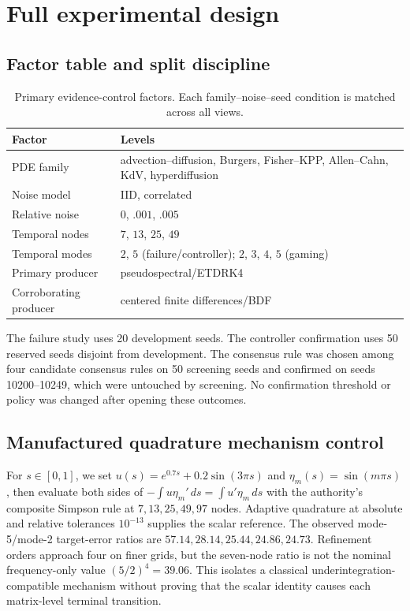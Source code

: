 \documentclass{article}
\begin{document}
\section{Full experimental design}

\subsection{Factor table and split discipline}
\begin{table}[ht]
\centering\small
\caption{Primary evidence-control factors. Each family--noise--seed condition is matched across all
views.}
\begin{tabular}{ll}
\toprule
Factor & Levels \\
\midrule
PDE family & advection--diffusion, Burgers, Fisher--KPP, Allen--Cahn, KdV, hyperdiffusion \\
Noise model & IID, correlated \\
Relative noise & $0$, $.001$, $.005$ \\
Temporal nodes & $7$, $13$, $25$, $49$ \\
Temporal modes & $2$, $5$ (failure/controller); $2$, $3$, $4$, $5$ (gaming) \\
Primary producer & pseudospectral/ETDRK4 \\
Corroborating producer & centered finite differences/BDF \\
\bottomrule
\end{tabular}
\end{table}

The failure study uses 20 development seeds. The controller confirmation uses 50 reserved seeds
disjoint from development. The consensus rule was chosen among four candidate consensus rules on
50 screening seeds and confirmed on seeds 10200--10249, which were untouched by screening. No
confirmation threshold or policy was changed after opening these outcomes.

\subsection{Manufactured quadrature mechanism control}
For $s\in[0,1]$, we set $u(s)=e^{0.7s}+0.2\sin(3\pi s)$ and
$\eta_m(s)=\sin(m\pi s)$, then evaluate both sides of
$-\int u\eta_m'\,ds=\int u'\eta_m\,ds$ with the authority's composite Simpson rule at
$7,13,25,49,97$ nodes. Adaptive quadrature at absolute and relative tolerances $10^{-13}$ supplies
the scalar reference. The observed mode-5/mode-2 target-error ratios are
$57.14,28.14,25.44,24.86,24.73$. Refinement orders approach four on finer grids, but the
seven-node ratio is not the nominal frequency-only value $(5/2)^4=39.06$. This isolates a
classical underintegration-compatible mechanism without proving that the scalar identity causes
each matrix-level terminal transition.
\end{document}
